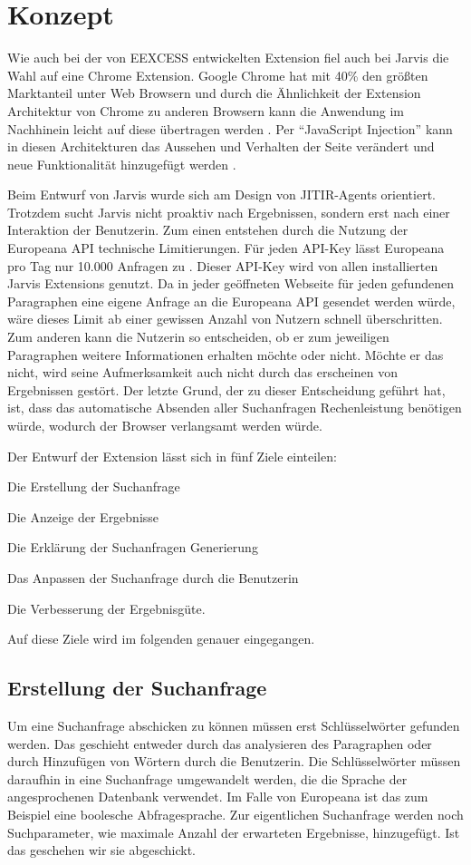 \section{Konzept}
 Wie auch bei der von EEXCESS entwickelten Extension fiel auch bei Jarvis die Wahl auf eine Chrome Extension. Google Chrome hat mit 40\% den größten Marktanteil unter Web Browsern und durch die Ähnlichkeit der Extension Architektur von Chrome zu anderen Browsern kann die Anwendung im Nachhinein leicht auf diese übertragen werden \cite{schlottererweb}. Per ``JavaScript Injection'' kann in diesen Architekturen das Aussehen und Verhalten der Seite verändert und neue Funktionalität hinzugefügt werden \cite{schlottererweb}.

 Beim Entwurf von Jarvis wurde sich am Design von JITIR-Agents orientiert. Trotzdem sucht Jarvis nicht proaktiv nach Ergebnissen, sondern erst nach einer Interaktion der Benutzerin. Zum einen entstehen durch die Nutzung der Europeana API technische Limitierungen. Für jeden API-Key lässt Europeana pro Tag nur 10.000 Anfragen zu \cite{europlimit}. Dieser API-Key wird von allen installierten Jarvis Extensions genutzt. Da in jeder geöffneten Webseite für jeden gefundenen Paragraphen eine eigene Anfrage an die Europeana API gesendet werden würde, wäre dieses Limit ab einer gewissen Anzahl von Nutzern schnell überschritten. Zum anderen kann die Nutzerin so entscheiden, ob er zum jeweiligen Paragraphen weitere Informationen erhalten möchte oder nicht. Möchte er das nicht, wird seine Aufmerksamkeit auch nicht durch das erscheinen von Ergebnissen gestört. Der letzte Grund, der zu dieser Entscheidung geführt hat, ist, dass das automatische Absenden aller Suchanfragen Rechenleistung benötigen würde, wodurch der Browser verlangsamt werden würde.

 Der Entwurf der Extension lässt sich in fünf Ziele einteilen:
 \begin{enumerate*}
 	\item Die Erstellung der Suchanfrage
 	\item Die Anzeige der Ergebnisse
  	\item Die Erklärung der Suchanfragen Generierung
 	\item Das Anpassen der Suchanfrage durch die Benutzerin
 	\item Die Verbesserung der Ergebnisgüte.
\end{enumerate*}
Auf diese Ziele wird im folgenden genauer eingegangen.

 \subsection{Erstellung der Suchanfrage}
 Um eine Suchanfrage abschicken zu können müssen erst Schlüsselwörter gefunden werden. Das geschieht entweder durch das analysieren des Paragraphen oder durch Hinzufügen von Wörtern durch die Benutzerin. Die Schlüsselwörter müssen daraufhin in eine Suchanfrage umgewandelt werden, die die Sprache der angesprochenen Datenbank verwendet. Im Falle von Europeana ist das zum Beispiel eine boolesche Abfragesprache. Zur eigentlichen Suchanfrage werden noch Suchparameter, wie maximale Anzahl der erwarteten Ergebnisse, hinzugefügt. Ist das geschehen wir sie abgeschickt.

